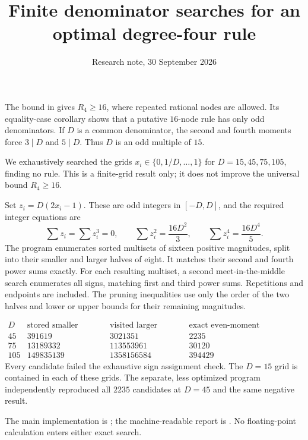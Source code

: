 \documentclass[11pt]{article}
\begin{document}
\title{Finite denominator searches for an optimal degree-four rule}
\author{Research note, 30 September 2026}
\date{}\maketitle

The bound in  gives $R_4\ge16$,
where repeated rational nodes are allowed. Its equality-case corollary
shows that a putative $16$-node rule has only odd denominators.
If $D$ is a common denominator, the second and fourth moments force
$3\mid D$ and $5\mid D$. Thus $D$ is an odd multiple of $15$.

We exhaustively searched the grids $x_i\in\{0,1/D,\ldots,1\}$ for
$D=15,45,75,105$, finding no rule. This is a finite-grid result only;
it does not improve the universal bound $R_4\ge16$.

Set $z_i=D(2x_i-1)$. These are odd integers in $[-D,D]$, and the
required integer equations are
\[
 \sum z_i=\sum z_i^3=0,\qquad
 \sum z_i^2=\frac{16D^2}{3},\qquad
 \sum z_i^4=\frac{16D^4}{5}.
\]
The program enumerates sorted multisets of sixteen positive magnitudes,
split into their smaller and larger halves of eight. It matches their
second and fourth power sums exactly. For each resulting multiset,
a second meet-in-the-middle search enumerates all signs, matching first
and third power sums. Repetitions and endpoints are included.
The pruning inequalities use only the order of the two halves and
lower or upper bounds for their remaining magnitudes.

\[
\begin{array}{r|r|r|r}
 D&\text{stored smaller halves}&\text{visited larger halves}
  &\text{exact even-moment candidates}\\\hline
45&391619&3021351&2235\\
75&13189332&113553961&30120\\
105&149835139&1358156584&394429
\end{array}
\]
Every candidate failed the exhaustive sign assignment check.
The $D=15$ grid is contained in each of these grids.
The separate, less optimized program
 independently reproduced all
$2235$ candidates at $D=45$ and the same negative result.

The main implementation is ;
the machine-readable report is .
No floating-point calculation enters either exact search.
\end{document}
